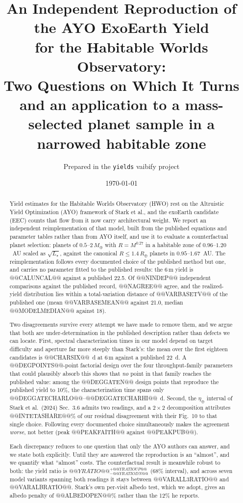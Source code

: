 \documentclass[11pt,a4paper]{article}
\title{\bfseries An Independent Reproduction of the AYO ExoEarth Yield\\
for the Habitable Worlds Observatory:\\
Two Questions on Which It Turns\\[0.4em]
\large and an application to a mass-selected planet sample in a narrowed habitable zone}
\author{Prepared in the \texttt{yields} vaibify project}
\date{\today}
\begin{document}
\maketitle

\begin{abstract}
\noindent
Yield estimates for the Habitable Worlds Observatory (HWO) rest on the Altruistic Yield
Optimization (AYO) framework of Stark et al., and the exoEarth candidate (EEC) counts that flow
from it now carry architectural weight. We report an independent reimplementation of that model,
built from the published equations and parameter tables rather than from AYO itself, and use it
to evaluate a counterfactual planet selection: planets of $0.5$--$2\,M_\oplus$ with
$R = M^{0.27}$ in a habitable zone of $0.96$--$1.20$~AU scaled as $\sqrt{L_\star}$, against the
canonical $R \le 1.4\,R_\oplus$ planets in $0.95$--$1.67$~AU. The reimplementation follows
every documented choice of the published method but one, and carries no parameter fitted to the
published results: the $6\,$m yield is @@CALUNCAL@@ against a published 22.5. Of @@NINDEP@@
independent comparisons against the published record, @@NAGREE@@ agree, and the realized-yield
distribution lies within a total-variation distance of @@VARBASETV@@ of the published one (mean
@@VARBASEMEAN@@ against 21.0, median @@MODELMEDIAN@@ against 18).

Two disagreements survive every attempt we have made to remove them, and we argue that both are
under-determination in the published description rather than defects we can locate. First,
spectral characterization times in our model depend on target difficulty and aperture far more
steeply than Stark's: the mean over the first eighteen candidates is @@CHARSIX@@~d at $6\,$m
against a published 22~d. A @@DEGPOINTS@@-point factorial design over the four throughput-family
parameters that could plausibly absorb this shows that \emph{no} point in that family reaches the
published value: among the @@DEGGATEN@@ design points that reproduce the published yield to
10\%, the characterization time spans only @@DEGGATECHARLO@@--@@DEGGATECHARHI@@~d. Second, the
$\eta_\oplus$ interval of Stark et al.\ (2024) Sec.~3.6 admits two readings, and a $2\times2$
decomposition attributes @@INTETASHARE@@\% of our residual disagreement with their Fig.~10 to
that single choice. Following every documented choice simultaneously makes the agreement
\emph{worse}, not better (peak @@PEAKFAITH@@ against @@PEAKPUB@@).

Each discrepancy reduces to one question that only the AYO authors can answer, and we state both
explicitly. Until they are answered the reproduction is an ``almost'', and we quantify what
``almost'' costs. The counterfactual result is meanwhile robust to both: the yield ratio is
$@@YRATIO@@^{+@@YRATIOUP@@}_{-@@YRATIODN@@}$ (68\% interval), and across seven model variants
spanning both readings it stays between @@VARALL3RATIO@@ and @@VARALBRATIO@@. Stark's own
per-visit albedo test, which we adopt, gives an albedo penalty of @@ALBEDOPEN@@\% rather than the
12\% he reports.
\end{abstract}
\end{document}
